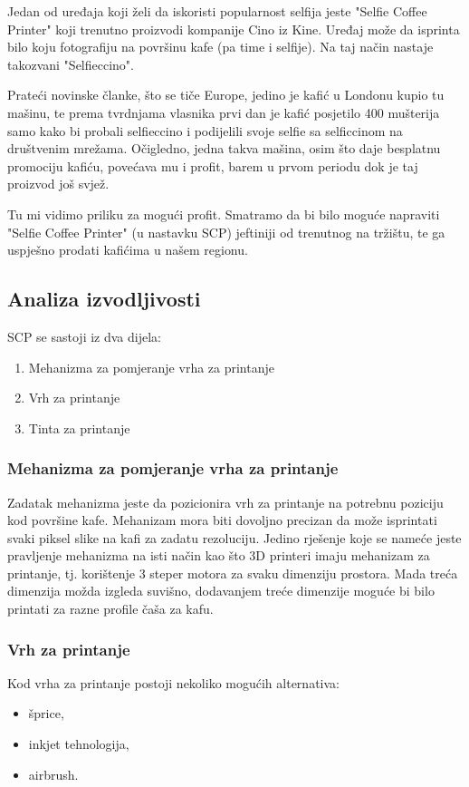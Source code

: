 \documentclass[12pt]{article}
\begin{document}
Jedan od uređaja koji želi da iskoristi popularnost selfija jeste "Selfie Coffee Printer" koji trenutno proizvodi kompanije Cino iz Kine. Uređaj može da isprinta bilo koju fotografiju na površinu kafe (pa time i selfije). Na taj način nastaje takozvani "Selfieccino". 

Prateći novinske članke, što se tiče Europe, jedino je kafić u Londonu kupio tu mašinu, te prema tvrdnjama vlasnika prvi dan je kafić posjetilo 400 mušterija samo kako bi probali selfieccino i podijelili svoje selfie sa selficcinom na društvenim mre\v{z}ama. Očigledno, jedna takva mašina, osim što daje besplatnu promociju kafiću, povećava mu i profit, barem u prvom periodu dok je taj proizvod još svjež.

Tu mi vidimo priliku za mogući profit. Smatramo da bi bilo moguće napraviti "Selfie Coffee Printer" (u nastavku SCP) jeftiniji od trenutnog na tržištu, te ga uspješno prodati kafićima u našem regionu.

\subsection{Analiza izvodljivosti}
SCP se sastoji iz dva dijela:
\begin{enumerate}
\item Mehanizma za pomjeranje vrha za printanje
\item Vrh za printanje
\item Tinta za printanje
\end{enumerate}

\subsubsection{Mehanizma za pomjeranje vrha za printanje}
Zadatak mehanizma jeste da pozicionira vrh za printanje na potrebnu poziciju kod površine kafe. Mehanizam mora biti dovoljno precizan da može isprintati svaki piksel slike na kafi za zadatu rezoluciju. Jedino rješenje koje se nameće jeste pravljenje mehanizma na isti način kao što 3D printeri imaju mehanizam za printanje, tj. korištenje 3 steper motora za svaku dimenziju prostora. Mada treća dimenzija možda izgleda suvišno, dodavanjem treće dimenzije moguće bi bilo printati za razne profile čaša za kafu.

\subsubsection{Vrh za printanje}
Kod vrha za printanje postoji nekoliko mogućih alternativa:
\begin{itemize}
\item šprice,
\item inkjet tehnologija,
\item airbrush.
\end{itemize}
\end{document}
